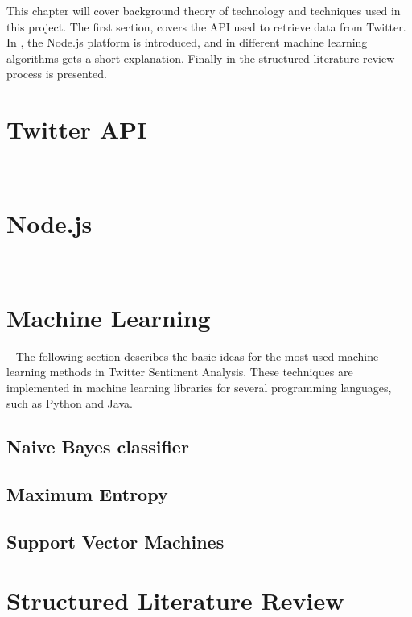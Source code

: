 This chapter will cover background theory of technology and techniques used in this project. 
The first section,  covers the API used to retrieve data from Twitter. In , the Node.js platform is introduced, and in  different machine learning algorithms gets a short explanation. Finally in  the structured literature review process is presented. 


\section{Twitter API}~\label{sec:twitterapi}


\section{Node.js}~\label{sec:nodejs}
	

\section{Machine Learning}~\label{sec:ml}
The following section describes the basic ideas for the most used machine learning methods in Twitter Sentiment Analysis. These techniques are implemented in machine learning libraries for several programming languages, such as Python and Java.
	\subsection{Naive Bayes classifier}
	
	
	\subsection{Maximum Entropy}
	
	
	\subsection{Support Vector Machines}
	

\section{Structured Literature Review}~\label{sec:backgroundslr}
